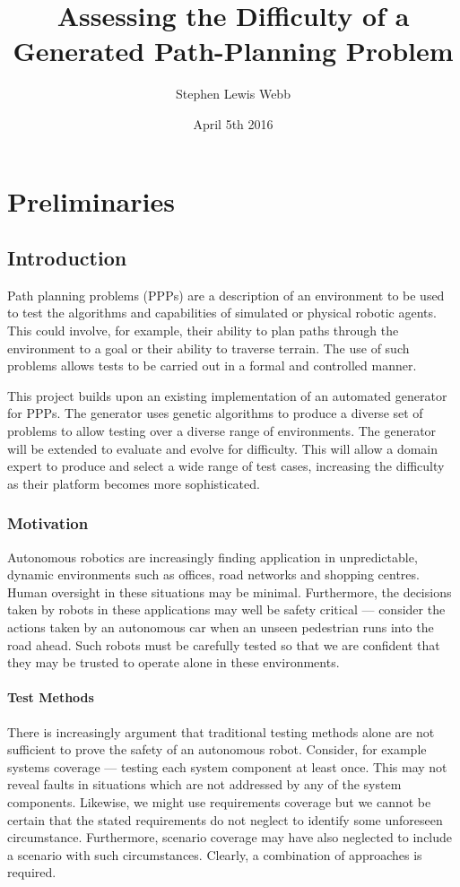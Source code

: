 \documentclass[authoryearcitations]{UoYCSproject}
\author{Stephen Lewis Webb}
\title{Assessing the Difficulty of a Generated Path-Planning Problem}
\date{April 5th 2016}
\begin{document}
\maketitle
\listoffigures
\listoftables


\part{Preliminaries}
\label{sec:start}
\chapter{Introduction}
\label{cha:Introduction}
Path planning problems (PPPs) are a description of an environment to be used to test the algorithms and capabilities of simulated or physical robotic agents. This could involve, for example, their ability to plan paths through the environment to a goal or their ability to traverse terrain. The use of such problems allows tests to be carried out in a formal and controlled manner.

This project builds upon an existing implementation of an automated generator for PPPs. The generator uses genetic algorithms to produce a diverse set of problems to allow testing over a diverse range of environments. The generator will be extended to evaluate and evolve for difficulty. This will allow a domain expert to produce and select a wide range of test cases, increasing the difficulty as their platform becomes more sophisticated.

\section{Motivation}
\label{sec:Motivation}
Autonomous robotics are increasingly finding application in unpredictable, dynamic environments such as offices, road networks and shopping centres. Human oversight in these situations may be minimal. Furthermore, the decisions taken by robots in these applications may well be safety critical --- consider the actions taken by an autonomous car when an unseen pedestrian runs into the road ahead. Such robots must be carefully tested so that we are confident that they may be trusted to operate alone in these environments.
\subsection{Test Methods}
\label{sec:test_methods}
There is increasingly argument that traditional testing methods alone are not sufficient to prove the safety of an autonomous robot. Consider, for example systems coverage --- testing each system component at least once. This may not reveal faults in situations which are not addressed by any of the system components. Likewise, we might use requirements coverage but we cannot be certain that the stated requirements do not neglect to identify some unforeseen circumstance. Furthermore, scenario coverage may have also neglected to include a scenario with such circumstances. Clearly, a combination of approaches is required.
\end{document}
